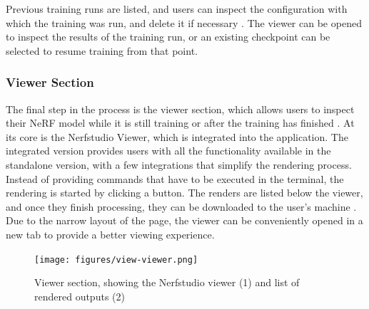 Previous training runs are listed, and users can inspect the configuration with which the training was run, and delete it if necessary .
The viewer can be opened to inspect the results of the training run, or an existing checkpoint can be selected to resume training from that point.

\subsubsection*{Viewer Section}

The final step in the process is the viewer section, which allows users to inspect their NeRF model while it is still training or after the training has finished .
At its core is the Nerfstudio Viewer, which is integrated into the application.
The integrated version provides users with all the functionality available in the standalone version, with a few integrations that simplify the rendering process.
Instead of providing commands that have to be executed in the terminal, the rendering is started by clicking a button.
The renders are listed below the viewer, and once they finish processing, they can be downloaded to the user's machine .
Due to the narrow layout of the page, the viewer can be conveniently opened in a new tab to provide a better viewing experience.

\begin{figure}[h!]
  \centering
  \texttt{[image: figures/view-viewer.png]}
  \caption{Viewer section, showing the Nerfstudio viewer (1) and list of rendered outputs (2)}
  \label{fig:design:viewer-section}
\end{figure}

